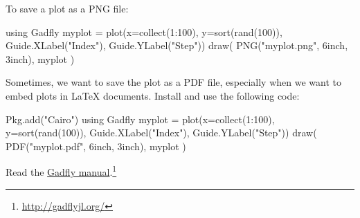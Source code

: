 To save a plot as a PNG file:
\begin{code}
using Gadfly
myplot = plot(x=collect(1:100), y=sort(rand(100)),
              Guide.XLabel("Index"), Guide.YLabel("Step"))
draw( PNG("myplot.png", 6inch, 3inch), myplot )
\end{code}

Sometimes, we want to save the plot as a PDF file, especially when we want to embed plots in \LaTeX{} documents. Install  and use the following code:
\begin{code}
Pkg.add("Cairo")
using Gadfly
myplot = plot(x=collect(1:100), y=sort(rand(100)),
              Guide.XLabel("Index"), Guide.YLabel("Step"))
draw( PDF("myplot.pdf", 6inch, 3inch), myplot )
\end{code}

Read the \href{http://gadflyjl.org/}{Gadfly manual}.\footnote{\url{http://gadflyjl.org/}}
